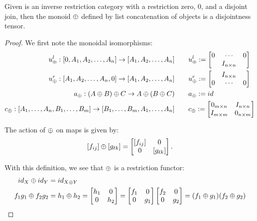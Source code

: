 \begin{lemma}\label{lem:imat_is_disjoint_tensor_category}
  Given \X is an inverse restriction category with a restriction zero, $0$, and a disjoint join,
  then the monoid $\oplus$ defined by list concatenation of objects is a disjointness tensor.
\end{lemma}
\begin{proof}
  We first note the monoidal isomorphisms:
  \begin{align*}
    u_{\oplus}^l : [0,A_1,A_2,\ldots,A_n] \to [A_1,A_2,\ldots,A_n] \qquad& u_{\oplus}^l :=
    \begin{bmatrix}
      0&\cdots&0 \\
      & I_{n\times n}
    \end{bmatrix}\\
    u_{\oplus}^r : [A_1,A_2,\ldots,A_n,0] \to [A_1,A_2,\ldots,A_n] \qquad & u_{\oplus}^r :=
    \begin{bmatrix}
      & I_{n\times n} \\
      0&\cdots&0
    \end{bmatrix} \\
    a_{\oplus} : (A\oplus B)\oplus C \to A\oplus (B\oplus C) \qquad &a_{\oplus} := id \\
    c_{\oplus} : [A_1,\ldots,A_n,B_1,\ldots,B_m] \to [B_1,\ldots,B_m,A_1,\ldots,A_n]  \qquad &
      c_{\oplus} := \begin{bmatrix}
                      0_{m\times n} & I_{n\times n} \\
                      I_{m\times m} & 0_{n\times m}
                \end{bmatrix}
  \end{align*}

  The action of $\oplus$ on maps is given by:
  \[
    [f_{ij}]\oplus [g_{\ell k}] = \begin{bmatrix}
      [f_{ij}] & 0 \\
      0 & [g_{\ell k}]
      \end{bmatrix}.
  \]

  With this definition, we see that $\oplus$ is a restriction functor:
  \begin{align*}
    id_X \oplus id_Y &= id_{X\oplus Y} \\
    f_1 g_1 \oplus f_2 g_2 &= h_1 \oplus h_2 =
    \begin{bmatrix}
      h_1 & 0 \\ 0 & h_2
    \end{bmatrix} =
    \begin{bmatrix}
      f_1 & 0 \\ 0 & g_1
    \end{bmatrix}
    \begin{bmatrix}
      f_2 & 0 \\ 0 & g_2
    \end{bmatrix} = (f_1 \oplus g_1) (f_2 \oplus g_2)
  \end{align*}


\end{proof}
